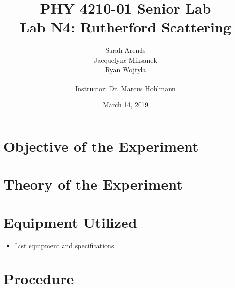 \documentclass[a4paper]{article}
\title{PHY 4210-01 Senior Lab \\Lab N4: Rutherford Scattering}
\author{Sarah Arends \\ 
        Jacquelyne Miksanek \\
        Ryan Wojtyla \\ \\
        Instructor: Dr. Marcus Hohlmann}
\date{March 14, 2019}
\begin{document}
\maketitle 

\begin{abstract}
  \qq 
\end{abstract}

\newpage

\tableofcontents

\newpage

\section{Objective of the Experiment}
\qq 

\section{Theory of the Experiment}

\qq

\qq 

\section{Equipment Utilized}

\qq 

\begin{itemize}
\item List equipment and specifications
\end{itemize}

\begin{figure}[H]
\centering
\label{name}
\end{figure}

\section{Procedure}
\end{document}
